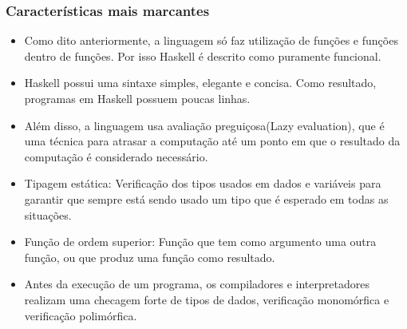 \begin{frame}
  \frametitle{Características mais marcantes}

  \begin{itemize}
    \item Como dito anteriormente, a linguagem só faz utilização de funções e funções dentro de funções. Por isso
    Haskell é descrito como puramente funcional. 
    \item Haskell possui uma sintaxe simples, elegante e concisa. Como resultado, programas em Haskell possuem 
    poucas linhas. 
    \item Além disso, a linguagem usa avaliação preguiçosa(Lazy evaluation), que é uma técnica para atrasar a computação 
    até um ponto em que o resultado da computação é considerado necessário.
    \item Tipagem estática: Verificação dos tipos usados em dados e variáveis para 
    garantir que sempre está sendo usado um tipo que é esperado em todas as situações. 
    \item Função de ordem superior: Função que tem como argumento uma outra função, ou que produz 
    uma função como resultado.
    \item Antes da execução de um programa, os compiladores e interpretadores realizam uma checagem forte de tipos
    de dados, verificação monomórfica e verificação polimórfica.
  \end{itemize}

\end{frame}
